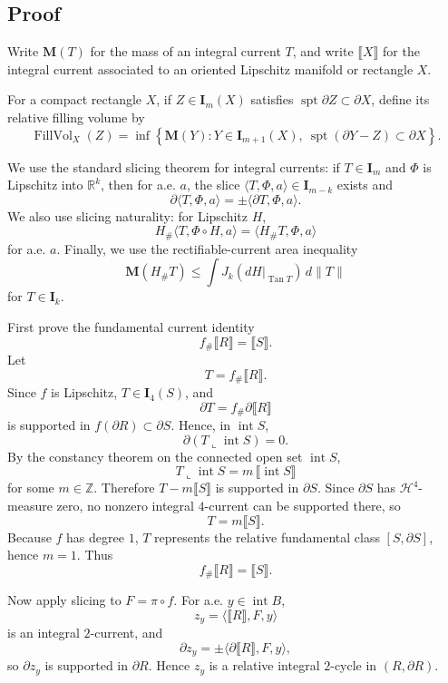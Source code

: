 \documentclass[12pt]{article}
\begin{document}
\subsection*{Proof}

Write \(\mathbf M(T)\) for the mass of an integral current \(T\), and write \(\llbracket X\rrbracket\) for the integral current associated to an oriented Lipschitz manifold or rectangle \(X\).

For a compact rectangle \(X\), if \(Z\in \mathbf I_m(X)\) satisfies \(\operatorname{spt}\partial Z\subset \partial X\), define its relative filling volume by
\[
\operatorname{FillVol}_X(Z)
=
\inf\left\{
\mathbf M(Y):
Y\in \mathbf I_{m+1}(X),\
\operatorname{spt}(\partial Y-Z)\subset \partial X
\right\}.
\]

We use the standard slicing theorem for integral currents: if \(T\in \mathbf I_m\) and \(\Phi\) is Lipschitz into \(\mathbb R^k\), then for a.e. \(a\), the slice \(\langle T,\Phi,a\rangle\in \mathbf I_{m-k}\) exists and
\[
\partial\langle T,\Phi,a\rangle
=
\pm \langle \partial T,\Phi,a\rangle.
\]
We also use slicing naturality: for Lipschitz \(H\),
\[
H_\#\langle T,\Phi\circ H,a\rangle
=
\langle H_\#T,\Phi,a\rangle
\]
for a.e. \(a\). Finally, we use the rectifiable-current area inequality
\[
\mathbf M(H_\#T)
\le
\int J_k(dH|_{\operatorname{Tan}T})\,d\|T\|
\]
for \(T\in\mathbf I_k\).

First prove the fundamental current identity
\[
f_\#\llbracket R\rrbracket=\llbracket S\rrbracket .
\]
Let
\[
T=f_\#\llbracket R\rrbracket.
\]
Since \(f\) is Lipschitz, \(T\in\mathbf I_4(S)\), and
\[
\partial T=f_\#\partial\llbracket R\rrbracket
\]
is supported in \(f(\partial R)\subset \partial S\). Hence, in \(\operatorname{int}S\),
\[
\partial(T\llcorner \operatorname{int}S)=0.
\]
By the constancy theorem on the connected open set \(\operatorname{int}S\),
\[
T\llcorner \operatorname{int}S
=
m\,\llbracket \operatorname{int}S\rrbracket
\]
for some \(m\in\mathbb Z\). Therefore \(T-m\llbracket S\rrbracket\) is supported in \(\partial S\). Since \(\partial S\) has \(\mathcal H^4\)-measure zero, no nonzero integral \(4\)-current can be supported there, so
\[
T=m\llbracket S\rrbracket.
\]
Because \(f\) has degree \(1\), \(T\) represents the relative fundamental class \([S,\partial S]\), hence \(m=1\). Thus
\[
f_\#\llbracket R\rrbracket=\llbracket S\rrbracket .
\]

Now apply slicing to \(F=\pi\circ f\). For a.e. \(y\in\operatorname{int}B\),
\[
z_y=\langle \llbracket R\rrbracket,F,y\rangle
\]
is an integral \(2\)-current, and
\[
\partial z_y
=
\pm \langle \partial\llbracket R\rrbracket,F,y\rangle,
\]
so \(\partial z_y\) is supported in \(\partial R\). Hence \(z_y\) is a relative integral \(2\)-cycle in \((R,\partial R)\).
\end{document}
